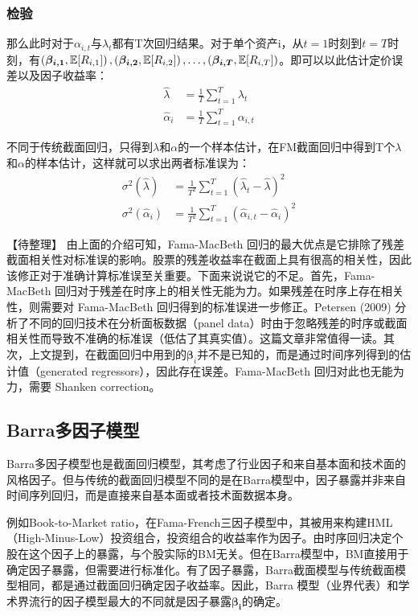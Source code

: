 \documentclass[11pt]{article}
\begin{document}
\subsubsection{检验}

那么此时对于$\alpha_{i,t}$与$\lambda_t$都有T次回归结果。对于单个资产i，从$t=1$时刻到$t=T$时刻，有$\left(\bm{\beta_{i,1}},\mathbb{E}[R_{i,1}]\right),\left(\bm{\beta_{i,2}},\mathbb{E}[R_{i,2}]\right),\dots,\left(\bm{\beta_{i,T}},\mathbb{E}[R_{i,T}]\right)$。即可以以此估计定价误差以及因子收益率：
\begin{align*}
    \hat{\lambda} &= \frac{1}{T} \sum_{t=1}^{T} \lambda_t \\
    \hat{\alpha}_i &= \frac{1}{T} \sum_{t=1}^{T} \alpha_{i,t}
\end{align*}

不同于传统截面回归，只得到$\lambda$和$\alpha$的一个样本估计，在FM截面回归中得到T个$\lambda$和$\alpha$的样本估计，这样就可以求出两者标准误为：
\begin{align*}
    \sigma^2(\hat{\lambda}) &= \frac{1}{T^2} \sum_{t=1}^{T} \left( \hat{\lambda}_t - \hat{\lambda} \right)^2 \\
    \sigma^2(\hat{\alpha}_i) &= \frac{1}{T^2} \sum_{t=1}^{T} \left( \hat{\alpha}_{i,t} - \hat{\alpha}_i \right)^2
\end{align*}

【待整理】
由上面的介绍可知，Fama-MacBeth 回归的最大优点是它排除了残差截面相关性对标准误的影响。股票的残差收益率在截面上具有很高的相关性，因此该修正对于准确计算标准误至关重要。下面来说说它的不足。首先，Fama-MacBeth 回归对于残差在时序上的相关性无能为力。如果残差在时序上存在相关性，则需要对 Fama-MacBeth 回归得到的标准误进一步修正。Petersen (2009) 分析了不同的回归技术在分析面板数据（panel data）时由于忽略残差的时序或截面相关性而导致不准确的标准误（低估了其真实值）。这篇文章非常值得一读。其次，上文提到，在截面回归中用到的$\bm{\beta}_i$并不是已知的，而是通过时间序列得到的估计值（generated regressors），因此存在误差。Fama-MacBeth 回归对此也无能为力，需要 Shanken correction。

\subsection{Barra多因子模型}

Barra多因子模型也是截面回归模型，其考虑了行业因子和来自基本面和技术面的风格因子。但与传统的截面回归模型不同的是在Barra模型中，因子暴露并非来自时间序列回归，而是直接来自基本面或者技术面数据本身。

例如Book-to-Market ratio，在Fama-French三因子模型中，其被用来构建HML（High-Minus-Low）投资组合，投资组合的收益率作为因子。由时序回归决定个股在这个因子上的暴露，与个股实际的BM无关。但在Barra模型中，BM直接用于确定因子暴露，但需要进行标准化。有了因子暴露，Barra截面模型与传统截面模型相同，都是通过截面回归确定因子收益率。因此，Barra 模型（业界代表）和学术界流行的因子模型最大的不同就是因子暴露$\bm{\beta_i}$的确定。
\end{document}
